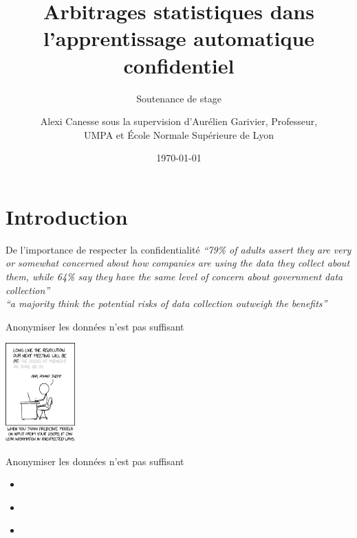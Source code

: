\documentclass[10pt,serif]{beamer}
\title[Arbitrages statistiques confidentiel] %
{Arbitrages statistiques dans l'apprentissage automatique confidentiel}
\subtitle{Soutenance de stage}
\author[Alexi Canesse]{{Alexi \sc Canesse} sous la supervision d'{Aurélien \sc Garivier}, Professeur,\\ UMPA et École Normale Supérieure de Lyon}
\institute[ÉNS de Lyon] %
{
  Stage de recherche effectué à l'UMPA dans le cadre de la \\
        L3 informatique fondamental de l'ÉNS de Lyon
}
\date[Soutenance de stage] %
{\today}
\begin{document}
% 


\begin{frame}
  \titlepage
\end{frame}



\section{Introduction}
  \begin{frame}{De l'importance de respecter la confidentialité}
    \textit{``79\% of adults assert they are very or somewhat concerned about how companies are using the data they collect about them, while 64\% say they have the same level of concern about government data collection'' }\\
      
    \textit{``a majority think the potential risks of data collection outweigh the benefits''}\\

  \end{frame}

  \begin{frame}{Anonymiser les données n'est pas suffisant}
    \begin{center}
      \includegraphics[width=0.20\textwidth, clip]{"./proofs/figures/predictive_models.png"}\\
    \end{center}
  \end{frame}

  \begin{frame}{Anonymiser les données n'est pas suffisant}
    \begin{itemize}
      \item<1->\\

      \item<2->\\
      
      \item<3->
    \end{itemize}

  \end{frame}
\end{document}
